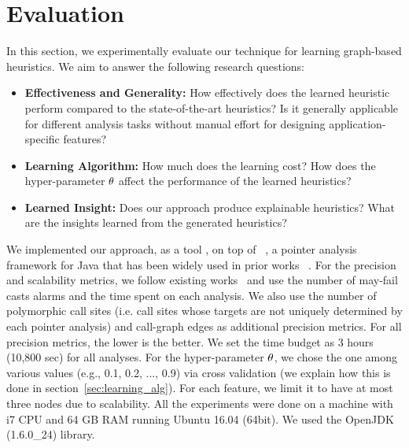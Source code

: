 
\section{Evaluation}
In this section, we experimentally evaluate our technique for learning graph-based heuristics.
We aim to answer the following research questions:

\begin{itemize}
\item {\bf Effectiveness and Generality:}
How effectively does the learned heuristic perform compared to the state-of-the-art heuristics?
Is it generally applicable for different analysis tasks without manual effort for designing application-specific features?

\item {\bf Learning Algorithm:}
How much does the learning cost?
How does the hyper-parameter ${\theta}$ affect the performance of the learned heuristics?

\item {\bf Learned Insight:}
Does our approach produce explainable heuristics?
What are the insights learned from the generated heuristics?
\end{itemize}

We implemented our approach, as a tool \OurCtx, on top of \Doop~\cite{BravenboerS09},
a pointer analysis framework for Java that has been widely used in prior works
~\cite{Smaragdakis2014,JeJeChOh17,JeJeOh18,Tan2017,TanLX16}.
For the precision and scalability metrics, we follow existing works~\cite{Tan2017,Li2018a,Li2018b,JeJeChOh17} and use the number of may-fail casts alarms and the time spent on each analysis.
We also use the number of polymorphic call sites (i.e. call sites whose targets are not uniquely determined by each pointer analysis) and call-graph edges as additional precision metrics. For all precision metrics, the lower is the better.
We set the time budget as 3 hours (10,800 sec) for all analyses.
For the hyper-parameter ${\theta}$, we chose the one among various values (e.g., 0.1, 0.2, ..., 0.9) via cross validation (we explain how this is done in section~\ref{sec:learning_alg}).
For each feature, we limit it to have at most three nodes due to scalability.
All the experiments were done on a machine with i7 CPU and 64 GB RAM running Ubuntu 16.04 (64bit).
We used the OpenJDK (1.6.0\_24) library.



